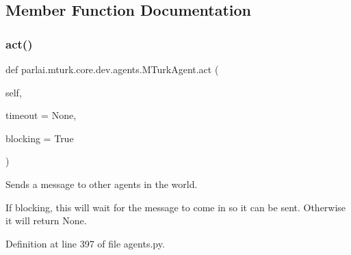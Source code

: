 \subsection{Member Function Documentation}
\mbox{\label{classparlai_1_1mturk_1_1core_1_1dev_1_1agents_1_1MTurkAgent_a398631dd8ea8c0960fc9adc8edb0e08b}} 
\subsubsection{\texorpdfstring{act()}{act()}}
{\footnotesize\ttfamily def parlai.\+mturk.\+core.\+dev.\+agents.\+M\+Turk\+Agent.\+act (\begin{DoxyParamCaption}\item[{}]{self,  }\item[{}]{timeout = {\ttfamily None},  }\item[{}]{blocking = {\ttfamily True} }\end{DoxyParamCaption})}

\begin{DoxyVerb}Sends a message to other agents in the world.

If blocking, this will wait for the message to come in so it can be sent.
Otherwise it will return None.
\end{DoxyVerb}
 

Definition at line 397 of file agents.\+py.


